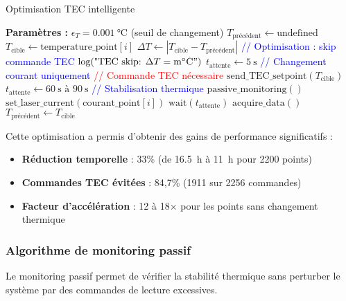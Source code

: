 \begin{algorithm}[ht]
\caption{Optimisation TEC intelligente}
\begin{algorithmic}[1]
\State \textbf{Paramètres :} $\epsilon_T = \SI{0,001}{\celsius}$ (seuil de changement)
\State $T_{\text{précédent}} \leftarrow \text{undefined}$
    \State $T_{\text{cible}} \leftarrow \text{temperature\_point}[i]$
    \State $\Delta T \leftarrow |T_{\text{cible}} - T_{\text{précédent}}|$
        \State \textcolor{blue}{// Optimisation : skip commande TEC}
        \State $\text{log}(\text{"TEC skip: } \Delta T = \SI{}{\milli\celsius}")$
        \State $t_{\text{attente}} \leftarrow \SI{5}{\second}$ \textcolor{blue}{// Changement courant uniquement}
    \Else
        \State \textcolor{red}{// Commande TEC nécessaire}
        \State $\text{send\_TEC\_setpoint}(T_{\text{cible}})$
        \State $t_{\text{attente}} \leftarrow \SI{60}{\second} \text{ à } \SI{90}{\second}$ \textcolor{blue}{// Stabilisation thermique}
        \State $\text{passive\_monitoring}()$
    \EndIf
    \State $\text{set\_laser\_current}(\text{courant\_point}[i])$
    \State $\text{wait}(t_{\text{attente}})$
    \State $\text{acquire\_data}()$
    \State $T_{\text{précédent}} \leftarrow T_{\text{cible}}$
\EndFor
\end{algorithmic}
\end{algorithm}

Cette optimisation a permis d'obtenir des gains de performance significatifs :
\begin{itemize}
\item \textbf{Réduction temporelle} : 33\% (de \SI{16,5}{\hour} à \SI{11}{\hour} pour 2200 points)
\item \textbf{Commandes TEC évitées} : 84,7\% (1911 sur 2256 commandes)
\item \textbf{Facteur d'accélération} : 12 à 18× pour les points sans changement thermique
\end{itemize}

\subsubsection{Algorithme de monitoring passif}

Le monitoring passif permet de vérifier la stabilité thermique sans perturber le système par des commandes de lecture excessives.

